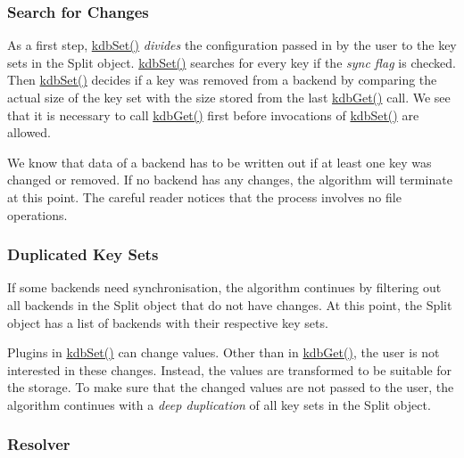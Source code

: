 \subsubsection*{Search for Changes}

As a first step, {\ttfamily \hyperlink{group__kdb_ga11436b058408f83d303ca5e996832bcf}{kdb\+Set()}} {\itshape divides} the configuration passed in by the user to the key sets in the {\ttfamily Split} object. {\ttfamily \hyperlink{group__kdb_ga11436b058408f83d303ca5e996832bcf}{kdb\+Set()}} searches for every key if the {\itshape sync flag} is checked. Then {\ttfamily \hyperlink{group__kdb_ga11436b058408f83d303ca5e996832bcf}{kdb\+Set()}} decides if a key was removed from a backend by comparing the actual size of the key set with the size stored from the last {\ttfamily \hyperlink{group__kdb_ga28e385fd9cb7ccfe0b2f1ed2f62453a1}{kdb\+Get()}} call. We see that it is necessary to call {\ttfamily \hyperlink{group__kdb_ga28e385fd9cb7ccfe0b2f1ed2f62453a1}{kdb\+Get()}} first before invocations of {\ttfamily \hyperlink{group__kdb_ga11436b058408f83d303ca5e996832bcf}{kdb\+Set()}} are allowed.

We know that data of a backend has to be written out if at least one key was changed or removed. If no backend has any changes, the algorithm will terminate at this point. The careful reader notices that the process involves no file operations.

\subsubsection*{Duplicated Key Sets}

If some backends need synchronisation, the algorithm continues by filtering out all backends in the {\ttfamily Split} object that do not have changes. At this point, the {\ttfamily Split} object has a list of backends with their respective key sets.

Plugins in {\ttfamily \hyperlink{group__kdb_ga11436b058408f83d303ca5e996832bcf}{kdb\+Set()}} can change values. Other than in {\ttfamily \hyperlink{group__kdb_ga28e385fd9cb7ccfe0b2f1ed2f62453a1}{kdb\+Get()}}, the user is not interested in these changes. Instead, the values are transformed to be suitable for the storage. To make sure that the changed values are not passed to the user, the algorithm continues with a {\itshape deep duplication} of all key sets in the {\ttfamily Split} object.

\subsubsection*{Resolver}

